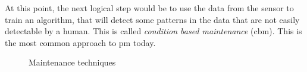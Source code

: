 At this point, the next logical step would be to use the data from the sensor to train an algorithm, that will detect some patterns in the data that are not easily detectable by a human. This is called \emph{condition based maintenance} (\gls{cbm}). This is the most common approach to \gls{pm} today.


\begin{figure}[htbp]
    \centering
    
    \caption{Maintenance techniques}
    \label{fig:maintthechniques}
\end{figure}
